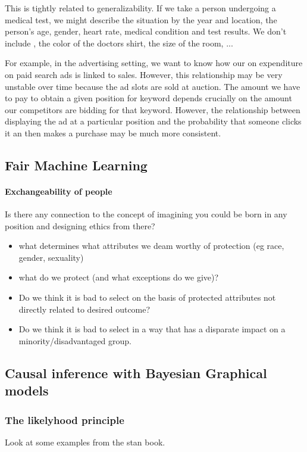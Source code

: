 \documentclass[11pt,a4paper,oneside]{book}
\begin{document}
This is tightly related to generalizability. If we take a person undergoing a medical test, we might describe the situation by the year and location, the person's age, gender, heart rate, medical condition and test results. We don't include , the color of the doctors shirt, the size of the room, ...

For example, in the advertising setting, we want to know how our on expenditure on paid search ads is linked to sales. However, this relationship may be very unstable over time because the ad slots are sold at auction. The amount we have to pay to obtain a given position for keyword depends crucially on the amount our competitors are bidding for that keyword. However, the relationship between displaying the ad at a particular position and the probability that someone clicks it an then makes a purchase may be much more consistent. 

\subsection*{Fair Machine Learning}
\paragraph*{Exchangeability of people} Is there any connection to the concept of imagining you could be born in any position and designing ethics from there?
\begin{itemize}
\item what determines what attributes we deam worthy of protection (eg race, gender, sexuality)
\item what do we protect (and what exceptions do we give)?
\item Do we think it is bad to select on the basis of protected attributes not directly related to desired outcome?
\item Do we think it is bad to select in a way that has a disparate impact on a minority/disadvantaged group.
\end{itemize}


\subsection*{Causal inference with Bayesian Graphical models}

\subsubsection*{The likelyhood principle}
Look at some examples from the stan book.
\end{document}
